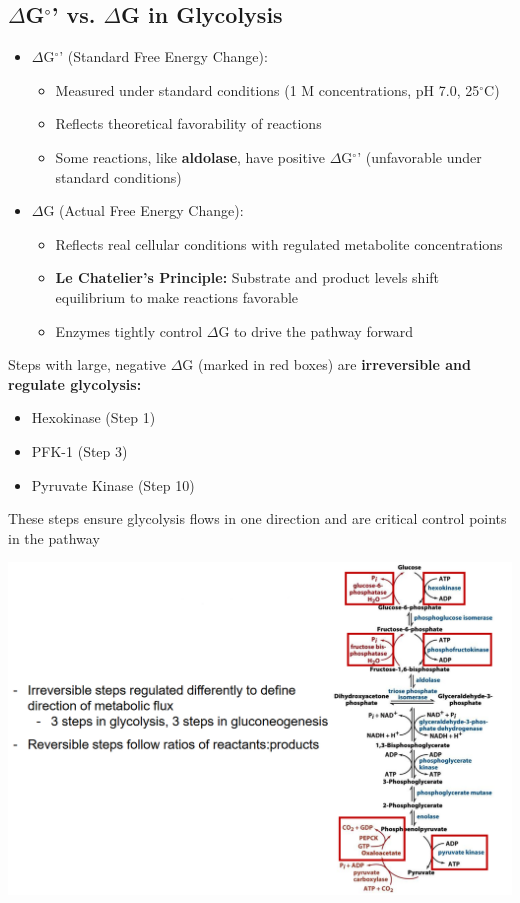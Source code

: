 \documentclass[10pt]{article}
\begin{document}
\subsection*{$\Delta$G$^\circ$' vs. $\Delta$G in Glycolysis}
\begin{itemize}
	\item $\Delta$G$^\circ$' (Standard Free Energy Change): 
	\begin{itemize}
        \item Measured under standard conditions (1 M concentrations, pH 7.0, 25$^\circ$C)
        \item Reflects theoretical favorability of reactions
        \item Some reactions, like \textbf{aldolase}, have positive $\Delta$G$^\circ$' (unfavorable under standard conditions)
    \end{itemize}
    \item $\Delta$G (Actual Free Energy Change):
    \begin{itemize}
        \item Reflects real cellular conditions with regulated metabolite concentrations
        \item \textbf{Le Chatelier's Principle:} Substrate and product levels shift equilibrium to make reactions favorable
        \item Enzymes tightly control $\Delta$G to drive the pathway forward
    \end{itemize}
\end{itemize}
Steps with large, negative $\Delta$G (marked in red boxes) are \textbf{irreversible and regulate glycolysis:}
\begin{itemize}
	\item Hexokinase (Step 1)
	\item PFK-1 (Step 3)
	\item Pyruvate Kinase (Step 10)
\end{itemize}
These steps ensure glycolysis flows in one direction and are critical control points in the pathway
\begin{center} 
	\includegraphics*[width=\textwidth]{L2_1.png}
\end{center}
\end{document}
